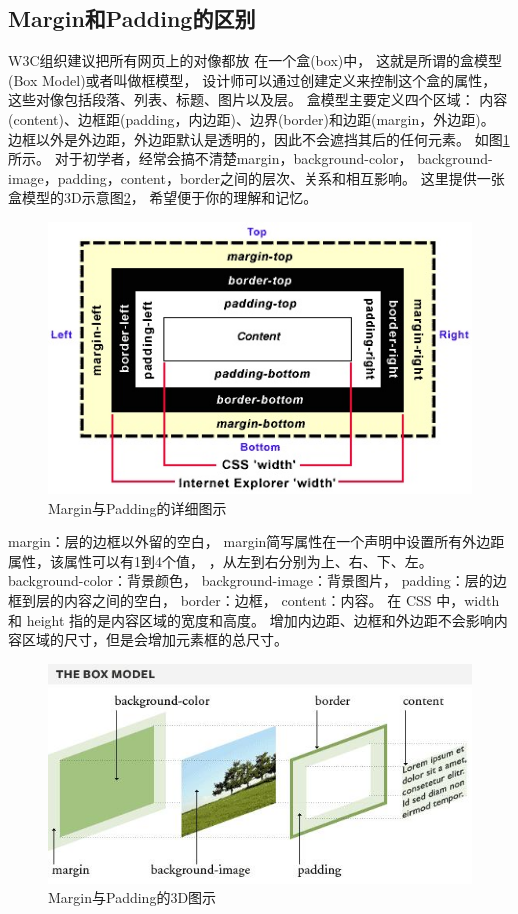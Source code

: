 \documentclass{book}
\begin{document}
\subsection{Margin和Padding的区别}

W3C组织建议把所有网页上的对像都放 在一个盒(box)中，
这就是所谓的盒模型(Box Model)或者叫做框模型，
设计师可以通过创建定义来控制这个盒的属性，
这些对像包括段落、列表、标题、图片以及层。
盒模型主要定义四个区域：
内容 (content)、边框距(padding，内边距)、边界(border)和边距(margin，外边距)。 
边框以外是外边距，外边距默认是透明的，因此不会遮挡其后的任何元素。
如图\ref{fig:DiffMarginPadding}所示。
对于初学者，经常会搞不清楚margin，background-color，
background- image，padding，content，border之间的层次、关系和相互影响。
这里提供一张盒模型的3D示意图\ref{fig:MarginAndPadding3DModel}，
希望便于你的理解和记忆。

\begin{figure}[htbp]
	\centering
	\includegraphics[scale=1]{DiffMarginPadding.jpg}
	\caption{Margin与Padding的详细图示}
	\label{fig:DiffMarginPadding}
\end{figure}

margin：层的边框以外留的空白，
margin简写属性在一个声明中设置所有外边距属性，该属性可以有1到4个值，
，从左到右分别为上、右、下、左。
background-color：背景颜色，
background-image：背景图片，
padding：层的边框到层的内容之间的空白， 
border：边框，
content：内容。
在 CSS 中，width 和 height 指的是内容区域的宽度和高度。
增加内边距、边框和外边距不会影响内容区域的尺寸，但是会增加元素框的总尺寸。
\begin{figure}[htbp]
	\centering
	\includegraphics[scale=1]{MarginAndPadding3DModel.jpg}
	\caption{Margin与Padding的3D图示}
	\label{fig:MarginAndPadding3DModel}
\end{figure}
\end{document}
